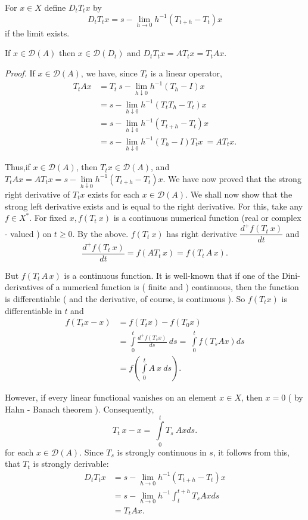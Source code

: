 \begin{defi*}
 For $ x \in X $ define $ D_t T_t x $ by
 $$
 D_t T_t x = s - \lim_{h \rightarrow 0} h^{-1} ( T_{t+h} - T_t ) x
 $$
 if the limit exists.
\end{defi*}

\begin{prop*}
 If $ x \in \mathscr{D} (A) $ then $ x \in \mathscr{D} (D_t) $ and $
 D_t T_t x = A T_t x = T_t A x $. 
\end{prop*}

\noindent\textit{Proof.}
 If $ x \in \mathscr{D} (A) $, we have, since $T_t $ is a linear operator,
 \begin{align*}
  T_t A x &= T_t ~s-\lim_{h \downarrow 0} h^{-1} (T_h -I ) x \\
  &= s-\lim_{h \downarrow 0} h^{-1} ( T_t T_h - T_t ) x\\
  &= s-\lim_{h \downarrow 0} h^{-1} ( T_{t+h} - T_t ) x\\
  &= s-\lim_{h \downarrow 0} h^{-1} ( T_h - I ) T_t x ~ = A T_t
  x.\tag*{$\Box$}
 \end{align*}

Thus,\pageoriginale if $x \in \mathscr{D} (A) $, then $ T_t x \in \mathscr{D} (A)
$, and $ T_t A x = A T_t x = s- \lim \limits_{h \downarrow 0} h^{-1}
(T_{t+h} - T_t ) x $. We have now proved that the strong right
derivative of $ T_t x $ exists for each $ x \in \mathscr{D} (A) $. We
shall now show that the strong left derivative exists and is equal to
the right derivative. For this, take any $f\in X^* $. For fixed $ x,
f (T_t~ x ) $ is a continuous numerical function (real or complex -
valued ) on $ t \ge 0 $. By the above. $f(T_t~ x)$ has right
derivative $\dfrac{d^+ f(T_t~ x)}{dt}$ and 
$$
\frac{d^+ f (T_t~ x)}{dt} = f ( A T_t\, x ) = f ( T_t\, A \,x ).
$$ 

But $f(T_t \,A \,x )$ is a continuous function. It is well-known that
if one of the Dini-derivatives of a numerical function is ( finite and
) continuous, then the function is differentiable ( and the
derivative, of course, is continuous ). So $ f( T_t x ) $ is
differentiable in $t$ and 
\begin{align*}
 f (T_t x -x ) &= f (T_t x ) - f (T_0 x ) \\
 &= \int \limits^{t}_{0} \frac{d^+ f (T_s x)}{ds} ~ ds = ~ \int
 \limits^{t}_{0} f (T_s A x ) ds \\ 
 &= f \left(\int \limits^{t}_{0} A~ x~ ds\right).
\end{align*}

However, if every linear functional vanishes on an element $ x \in X
$, then $ x = 0 $ ( by Hahn - Banach theorem ). Consequently, 
$$
T_t ~ x -x = ~ \int \limits^{t}_{0} T_s ~ A x ds.
$$
for each $ x \in \mathscr{D} (A) $. Since $T_s$ is strongly
continuous in $s$, it follows from this, that $T_t$ is strongly
derivable: 
\begin{align*}
 D_t T_t x &= s- \lim_{h \rightarrow 0} h^{-1} ( T_{t+h} - T_t ) x\\
 &= s- \lim_{h \rightarrow 0} h^{-1} \int^{t+h}_t T_s A x ds \\
 &= T_t A x.
\end{align*}
